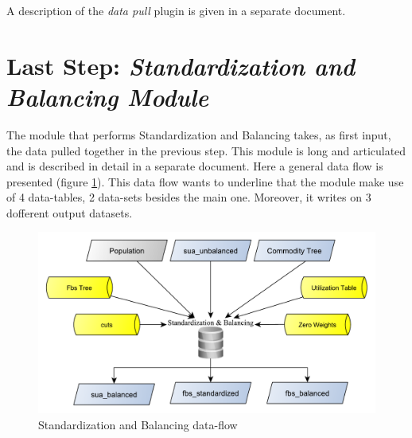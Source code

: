 \documentclass[]{article}
\begin{document}
A description of the \emph{data pull} plugin is given in a separate
document.

\section{\texorpdfstring{Last Step: \emph{Standardization and Balancing
Module}}{Last Step: Standardization and Balancing Module}}\label{last-step-standardization-and-balancing-module}

The module that performs Standardization and Balancing takes, as first
input, the data pulled together in the previous step. This module is
long and articulated and is described in detail in a separate document.
Here a general data flow is presented (figure \ref{fig:f18}). This data
flow wants to underline that the module make use of 4 data-tables, 2
data-sets besides the main one. Moreover, it writes on 3 dofferent
output datasets.

\begin{figure}[H]

{\centering \includegraphics[width=0.8\linewidth]{images/SwsFbs/18_standBAl} 

}

\caption{\label{fig:f18}Standardization and Balancing data-flow}\label{fig:f18}
\end{figure}
\end{document}
